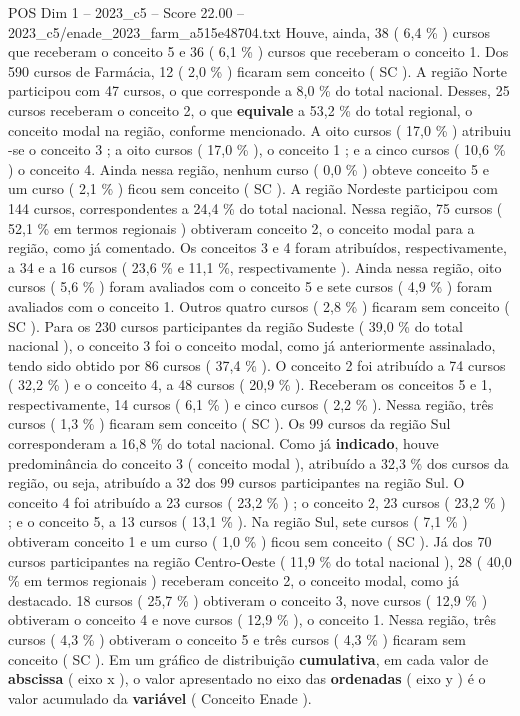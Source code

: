 \begin{textsample}{POS Dim 1 – 2023\_c5 – Score 22.00 – 2023\_c5/enade\_2023\_farm\_a515e48704.txt}
Houve, ainda, 38 ( 6,4 \% ) cursos que receberam o conceito 5 e 36 ( 6,1 \% ) cursos que receberam o conceito 1.
Dos 590 cursos de Farmácia, 12 ( 2,0 \% ) ficaram sem conceito ( SC ).
A região Norte participou com 47 cursos, o que corresponde a 8,0 \% do total nacional.
Desses, 25 cursos receberam o conceito 2, o que \textbf{equivale} a 53,2 \% do total regional, o conceito modal na região, conforme mencionado.
A oito cursos ( 17,0 \% ) atribuiu -se o conceito 3 ; a oito cursos ( 17,0 \% ), o conceito 1 ; e a cinco cursos ( 10,6 \% ) o conceito 4.
Ainda nessa região, nenhum curso ( 0,0 \% ) obteve conceito 5 e um curso ( 2,1 \% ) ficou sem conceito ( SC ).
A região Nordeste participou com 144 cursos, correspondentes a 24,4 \% do total nacional.
Nessa região, 75 cursos ( 52,1 \% em termos regionais ) obtiveram conceito 2, o conceito modal para a região, como já comentado.
Os conceitos 3 e 4 foram atribuídos, respectivamente, a 34 e a 16 cursos ( 23,6 \% e 11,1 \%, respectivamente ).
Ainda nessa região, oito cursos ( 5,6 \% ) foram avaliados com o conceito 5 e sete cursos ( 4,9 \% ) foram avaliados com o conceito 1.
Outros quatro cursos ( 2,8 \% ) ficaram sem conceito ( SC ).
Para os 230 cursos participantes da região Sudeste ( 39,0 \% do total nacional ), o conceito 3 foi o conceito modal, como já anteriormente assinalado, tendo sido obtido por 86 cursos ( 37,4 \% ).
O conceito 2 foi atribuído a 74 cursos ( 32,2 \% ) e o conceito 4, a 48 cursos ( 20,9 \% ).
Receberam os conceitos 5 e 1, respectivamente, 14 cursos ( 6,1 \% ) e cinco cursos ( 2,2 \% ).
Nessa região, três cursos ( 1,3 \% ) ficaram sem conceito ( SC ).
Os 99 cursos da região Sul corresponderam a 16,8 \% do total nacional.
Como já \textbf{indicado}, houve predominância do conceito 3 ( conceito modal ), atribuído a 32,3 \% dos cursos da região, ou seja, atribuído a 32 dos 99 cursos participantes na região Sul.
O conceito 4 foi atribuído a 23 cursos ( 23,2 \% ) ; o conceito 2, 23 cursos ( 23,2 \% ) ; e o conceito 5, a 13 cursos ( 13,1 \% ).
Na região Sul, sete cursos ( 7,1 \% ) obtiveram conceito 1 e um curso ( 1,0 \% ) ficou sem conceito ( SC ).
Já dos 70 cursos participantes na região Centro-Oeste ( 11,9 \% do total nacional ), 28 ( 40,0 \% em termos regionais ) receberam conceito 2, o conceito modal, como já destacado. 18 cursos ( 25,7 \% ) obtiveram o conceito 3, nove cursos ( 12,9 \% ) obtiveram o conceito 4 e nove cursos ( 12,9 \% ), o conceito 1.
Nessa região, três cursos ( 4,3 \% ) obtiveram o conceito 5 e três cursos ( 4,3 \% ) ficaram sem conceito ( SC ).
Em um gráfico de distribuição \textbf{cumulativa}, em cada valor de \textbf{abscissa} ( eixo x ), o valor apresentado no eixo das \textbf{ordenadas} ( eixo y ) é o valor acumulado da \textbf{variável} ( Conceito Enade ).

\end{textsample}
